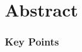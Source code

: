 \documentclass[letterpaper,12pt]{article}
\begin{document}


\begingroup
\let\newpage\relax%
\maketitle
\endgroup

\section*{Abstract}



\vspace{20pt}
\subsubsection*{Key Points}
{\small

}

\thispagestyle{empty}
\clearpage


\tableofcontents
\listoftables
\listoffigures

\pagebreak

\begin{spacing}{1.2}
\begin{linenumbers}

\end{linenumbers}
\end{spacing}



{\small}
\end{document}
